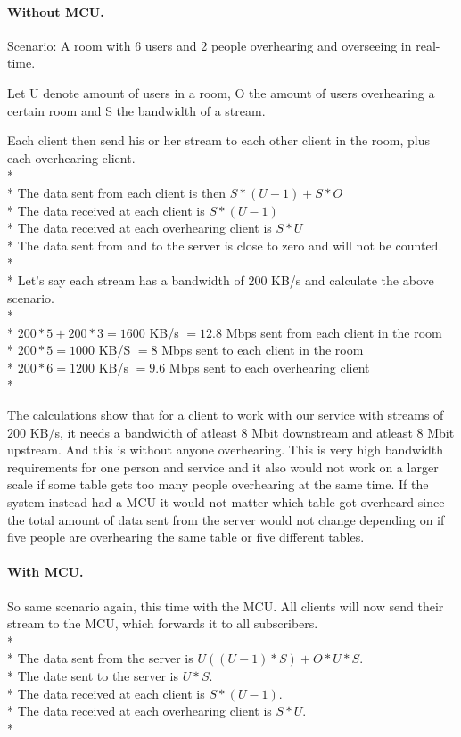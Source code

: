 \documentclass[12pt, titlepage]{article}
\begin{document}
\paragraph{Without MCU.}
Scenario: A room with 6 users and 2 people overhearing and overseeing in real-time.

Let U denote amount of users in a room, O the amount of users overhearing a certain room and S the bandwidth of a stream. 

Each client then send his or her stream to each other client in the room, plus each overhearing client.
\\*
\\*
The data sent from each client is then $S*(U-1)+S*O$\\*
The data received at each client is $S*(U-1)$\\*
The data received at each overhearing client is $S*U$\\*
The data sent from and to the server is close to zero and will not be counted.
\\*\\*
Let's say each stream has a bandwidth of 200 KB/s and calculate the above scenario.
\\*
\\*
$200*5 + 200*3 = 1600$ KB/s $= 12.8$ Mbps sent from each client in the room\\*
$200*5 = 1000$ KB/S  $= 8$ Mbps sent to each client in the room\\*
$200*6 = 1200$ KB/s $= 9.6$ Mbps sent to each overhearing client\\*

The calculations show that for a client to work with our service with streams of $200$ KB/s, it needs a bandwidth of atleast 8 Mbit downstream and atleast 8 Mbit upstream. And this is without anyone overhearing. This is very high bandwidth requirements for one person and service and it also would not work on a larger scale if some table gets too many people overhearing at the same time. If the system instead had a MCU it would not matter which table got overheard since the total amount of data sent from the server would not change depending on if five people are overhearing the same table or five different tables.
\paragraph{With MCU.}
So same scenario again, this time with the MCU. All clients will now send their stream to the MCU, which forwards it to all subscribers.
\\*
\\*
The data sent from the server is $U((U-1)*S) + O*U*S$.\\* 
The date sent to the server is $U*S$.\\*
The data received at each client is $S*(U-1)$.\\*
The data received at each overhearing client is $S*U$.\\*
\end{document}
